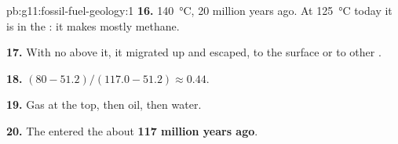 \begin{solution}{pb:g11:fossil-fuel-geology:1}
\textbf{16.} \qty{140}{\degreeCelsius}, 20 million years ago. At
\qty{125}{\degreeCelsius} today it is in the : it makes mostly
methane.

\textbf{17.} With no  above it, it migrated up and escaped, to the
surface or to other .

\textbf{18.} $(80 - 51.2)/(117.0 - 51.2) \approx 0.44$.

\textbf{19.} Gas at the top, then oil, then water.

\textbf{20.} The  entered the  about \textbf{117
million years ago}.
\end{solution}
